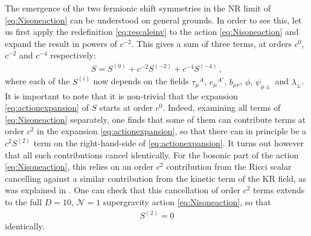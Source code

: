 \documentclass[a4paper,10pt,openany]{article}
\begin{document}
	The emergence of the two fermionic shift symmetries in the NR limit of \eqref{eq:Nisoneaction} can be understood on general grounds. In order to see this, let us first apply the redefinition \eqref{eq:rescaleinv} to the action \eqref{eq:Nisoneaction} and expand the result in powers of $c^{-2}$. This gives a sum of three terms, at orders $c^0$, $c^{-2}$ and $c^{-4}$ respectively:
	\begin{align} \label{eq:actionexpansion}
		S = S^{(0)} + c^{-2} S^{(-2)} + c^{-4} S^{(-4)} \,,
	\end{align}
	where each of the $S^{(i)}$ now depends on the fields $\tau_\mu{}^A$, $e_\mu{}^{A'}$, $b_{\mu\nu}$, $\phi$, $\psi_{\mu\pm}$ and $\lambda_\pm$. It is important to note that it is non-trivial that the expansion \eqref{eq:actionexpansion} of $S$ starts at order $c^0$. Indeed, examining all terms of \eqref{eq:Nisoneaction} separately, one finds that some of them can contribute terms at order $c^2$ in the expansion \eqref{eq:actionexpansion}, so that there can in principle be a $c^2 S^{(2)}$ term on the right-hand-side of \eqref{eq:actionexpansion}. It turns out however that all such contributions cancel identically. For the bosonic part of the action \eqref{eq:Nisoneaction}, this relies on an order $c^2$ contribution from the Ricci scalar cancelling against a similar contribution from the kinetic term of the KR field, as was explained in \cite{Bergshoeff:2021bmc}. One can check that this cancellation of order $c^2$ terms extends to the full $D=10$, $\mathcal{N}=1$ supergravity action \eqref{eq:Nisoneaction}, so that
	\begin{align} \label{eq:S2zero}
		S^{(2)} = 0
	\end{align}
	identically.
	
\end{document}
